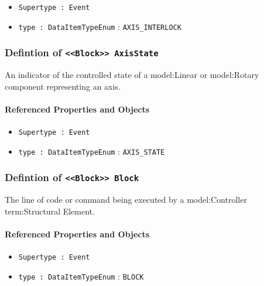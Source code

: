 \begin{itemize}
\item \texttt{Supertype : Event}

\item \texttt{type : DataItemTypeEnum} : \texttt{AXIS_INTERLOCK}

\end{itemize}
\FloatBarrier
\subsubsection{Defintion of \texttt{<<Block>> AxisState}}
  \label{type:AxisState}

\FloatBarrier

An indicator of the controlled state of a {model:Linear} or {model:Rotary} component representing an axis.

\FloatBarrier
\paragraph{Referenced Properties and Objects}

\begin{itemize}
\item \texttt{Supertype : Event}

\item \texttt{type : DataItemTypeEnum} : \texttt{AXIS_STATE}

\end{itemize}
\FloatBarrier
\subsubsection{Defintion of \texttt{<<Block>> Block}}
  \label{type:Block}

\FloatBarrier

The line of code or command being executed by a {model:Controller} {term:Structural Element}.

\FloatBarrier
\paragraph{Referenced Properties and Objects}

\begin{itemize}
\item \texttt{Supertype : Event}

\item \texttt{type : DataItemTypeEnum} : \texttt{BLOCK}

\end{itemize}
\FloatBarrier
